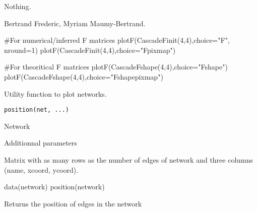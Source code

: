 \documentclass[a4paper]{book}
\begin{document}
%
\begin{Value}
Nothing.
\end{Value}
%
\begin{Author}\relax
Bertrand Frederic, Myriam Maumy-Bertrand.
\end{Author}
%
\begin{Examples}
\begin{ExampleCode}
#For numerical/inferred F matrices
plotF(CascadeFinit(4,4),choice="F", nround=1)
plotF(CascadeFinit(4,4),choice="Fpixmap")

#For theoritical F matrices
plotF(CascadeFshape(4,4),choice="Fshape")
plotF(CascadeFshape(4,4),choice="Fshapepixmap")
\end{ExampleCode}
\end{Examples}
%
\begin{Description}\relax
Utility function to plot networks.
\end{Description}
%
\begin{Usage}
\begin{verbatim}
position(net, ...)
\end{verbatim}
\end{Usage}
%
\begin{Arguments}
\begin{ldescription}
\item[\code{net}] Network
\item[\code{...}] Additionnal parameters

\end{ldescription}
\end{Arguments}
%
\begin{Value}
Matrix with as many rows as the number of edges of network and three columns (name, xcoord, ycoord).
\end{Value}
%
\begin{Examples}
\begin{ExampleCode}
data(network)
position(network)
\end{ExampleCode}
\end{Examples}
%
\begin{Description}\relax
Returns the position of edges in the network
\end{Description}
\end{document}
